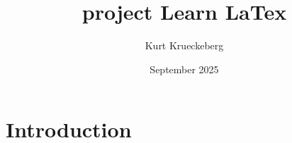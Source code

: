 \documentclass[]{article}
\title{project Learn LaTex}
\author{Kurt Krueckeberg}
\date{September 2025}
\begin{document}
\maketitle

\section{Introduction}

\lipsum[1-6]
\end{document}
